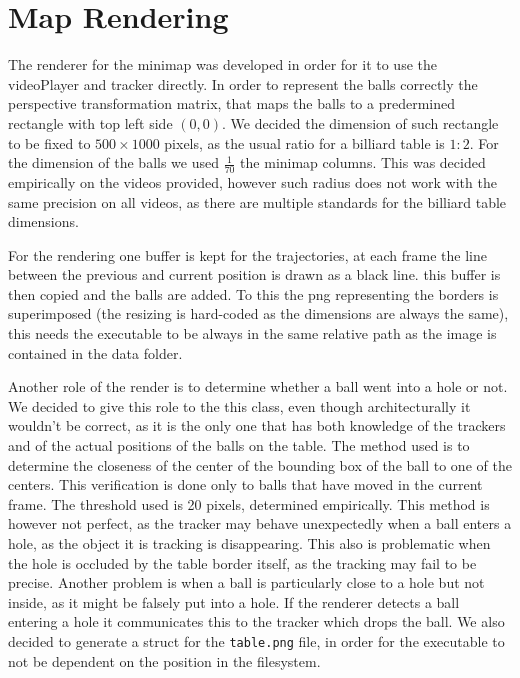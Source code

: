 \section{Map Rendering}

The renderer for the minimap was developed in order for it to use the videoPlayer and 
tracker directly. In order to represent the balls correctly the perspective transformation
matrix, that maps the balls to a predermined rectangle with top left side $(0,0)$. We decided
the dimension of such rectangle to be fixed to $500 \times 1000$ pixels, as the usual ratio
for a billiard table is $1:2$. For the dimension of the balls we used $\frac{1}{70}$ the minimap
columns. This was decided empirically on the videos provided, however such radius does not work
with the same precision on all videos, as there are multiple standards for the billiard table 
dimensions.\par 
For the rendering one buffer is kept for the trajectories, at each frame the line between the
previous and current position is drawn as a black line. this buffer is then copied and the
balls are added. To this the png representing the borders is superimposed (the resizing is hard-coded
as the dimensions are always the same), this needs the executable to be always in the same relative
path as the image is contained in the data folder.\par 
Another role of the render is to determine whether a ball went into a hole or not. We decided to
give this role to the this class, even though architecturally it wouldn't be correct, as it is the 
only one that has both knowledge of the trackers and of the actual positions of the balls on the table.
The method used is to determine the closeness of the center of the bounding box of the ball to one 
of the centers. This verification is done only to balls that have moved in the current frame. The
threshold used is 20 pixels, determined empirically. This method is however not perfect, as the 
tracker may behave unexpectedly when a ball enters a hole, as the object it is tracking is disappearing.
This also is problematic when the hole is occluded by the table border itself, as the tracking may fail
to be precise. Another problem is when a ball is particularly close to a hole but not inside, as it
might be falsely put into a hole. If the renderer detects a ball entering a hole it communicates
this to the tracker which drops the ball.
We also decided to generate a struct for the \verb|table.png| file, in order for the executable to not be dependent on the position in the filesystem.
